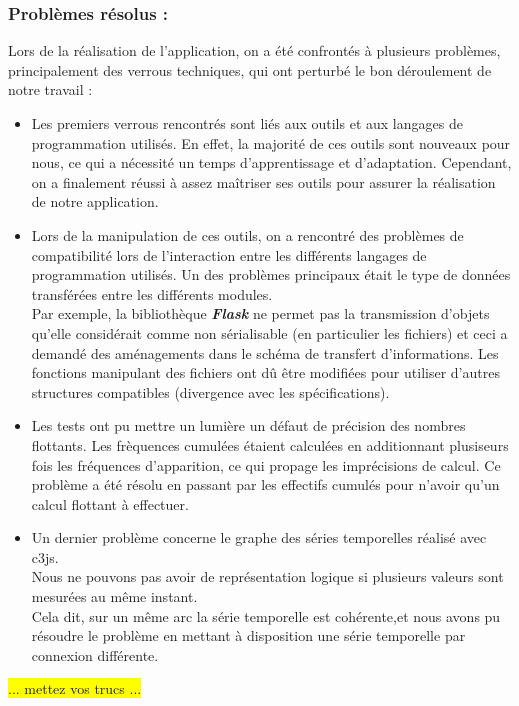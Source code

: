 			\subsubsection*{Problèmes résolus :} 
			Lors de la réalisation de l'application, on a été confrontés à plusieurs problèmes, principalement des verrous techniques, qui ont perturbé le bon déroulement de notre travail : 
			\begin{itemize}[leftmargin=*]
				\item Les premiers verrous rencontrés sont liés aux outils et aux langages de programmation utilisés. En effet, la majorité de ces outils sont nouveaux pour nous, ce qui a nécessité un temps d'apprentissage et d'adaptation. Cependant, on a finalement réussi à assez maîtriser ses outils pour assurer la réalisation de notre application.
				\item Lors de la manipulation de ces outils, on a rencontré des problèmes de compatibilité lors de l'interaction entre les différents langages de programmation utilisés. Un des problèmes principaux était le type de données transférées entre les différents modules.\\
					Par exemple, la bibliothèque \textit{\textbf{Flask}} ne permet pas la transmission d'objets qu'elle considérait comme non sérialisable (en particulier les fichiers) et ceci a demandé des aménagements dans le schéma de transfert d'informations. Les fonctions manipulant des fichiers ont dû être modifiées pour utiliser d'autres structures compatibles (divergence avec les spécifications).
				\item Les tests ont pu mettre un lumière un défaut de précision des nombres flottants. Les frèquences cumulées étaient calculées en additionnant plusiseurs fois les fréquences d'apparition, ce qui propage les imprécisions de calcul.  Ce problème a été résolu en passant par les effectifs cumulés pour n'avoir qu'un calcul flottant à effectuer.
				\item Un dernier problème concerne le graphe des séries temporelles réalisé avec c3js.\\
					Nous ne pouvons pas avoir de représentation logique si plusieurs valeurs sont mesurées au même instant.\\
					Cela dit, sur un même arc la série temporelle est cohérente,et nous avons pu résoudre le problème en mettant à disposition une série temporelle par connexion différente.
			\end{itemize}
				\colorbox{yellow}{... mettez vos trucs ...}
				

